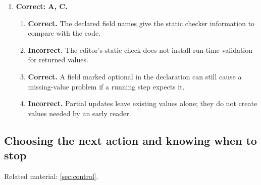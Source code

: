 \begin{enumerate}[start=11,itemsep=0.7\baselineskip]
\item[{\hyperref[exercise:20]{20.}}] \begin{minipage}[t]{\linewidth}
\textbf{Correct: A, C.}
\begin{enumerate}[label=\textnormal{(\Alph*)},leftmargin=*,itemsep=0pt]
\item \textbf{Correct.} The declared field names give the static checker information to compare with the code.
\item \textbf{Incorrect.} The editor's static check does not install run-time validation for returned values.
\item \textbf{Correct.} A field marked optional in the declaration can still cause a missing-value problem if a running step expects it.
\item \textbf{Incorrect.} Partial updates leave existing values alone; they do not create values needed by an early reader.
\end{enumerate}
\end{minipage}

\end{enumerate}

\subsection{Choosing the next action and knowing when to stop}
\noindent Related material: \cref{sec:control}.

